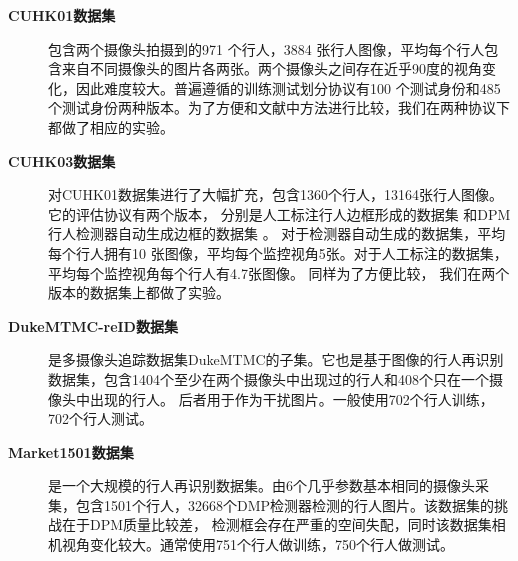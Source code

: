 \begin{description}
	\item[\textbf{CUHK01数据集}]
包含两个摄像头拍摄到的971 个行人，3884 张行人图像，平均每个行人包含来自不同摄像头的图片各两张。两个摄像头之间存在近乎90度的视角变化，因此难度较大。普遍遵循的训练测试划分协议有100 个测试身份和485个测试身份两种版本。为了方便和文献中方法进行比较，我们在两种协议下都做了相应的实验。
\item[\textbf{CUHK03数据集}]
对CUHK01数据集进行了大幅扩充，包含1360个行人，13164张行人图像。它的评估协议有两个版本，
分别是人工标注行人边框形成的数据集
和DPM行人检测器自动生成边框的数据集
。
对于检测器自动生成的数据集，平均每个行人拥有10 张图像，平均每个监控视角5张。对于人工标注的数据集，平均每个监控视角每个行人有4.7张图像。
同样为了方便比较，
我们在两个版本的数据集上都做了实验。




\item[\textbf{DukeMTMC-reID数据集}]是多摄像头追踪数据集DukeMTMC的子集。它也是基于图像的行人再识别数据集，包含1404个至少在两个摄像头中出现过的行人和408个只在一个摄像头中出现的行人。
后者用于作为干扰图片。一般使用702个行人训练，702个行人测试。

\item[\textbf{Market1501数据集}]是一个大规模的行人再识别数据集。由6个几乎参数基本相同的摄像头采集，包含1501个行人，32668个DMP检测器检测的行人图片。该数据集的挑战在于DPM质量比较差，
检测框会存在严重的空间失配，同时该数据集相机视角变化较大。通常使用751个行人做训练，750个行人做测试。
\end{description}

